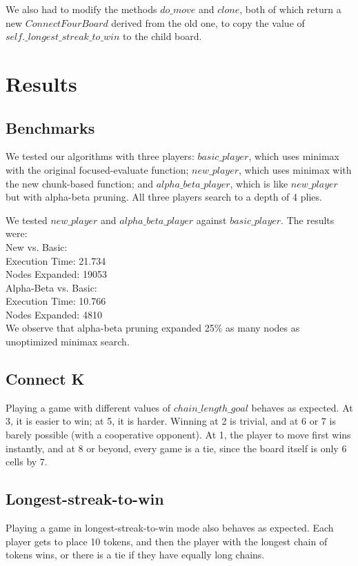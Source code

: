 \documentclass[11pt]{article}
\begin{document}
We also had to modify the methods \(do\_move\) and \(clone\), both of which
return a new \(ConnectFourBoard\) derived from the old one, to copy the value
of \(self.\_longest\_streak\_to\_win\) to the child board.

\section{Results}

\subsection{Benchmarks}

We tested our algorithms with three players: \(basic\_player\), which uses
minimax with the original focused-evaluate function; \(new\_player\), which
uses minimax with the new chunk-based function; and \(alpha\_beta\_player\),
which is like \(new\_player\) but with alpha-beta pruning. All three players
search to a depth of 4 plies.

We tested \(new\_player\) and \(alpha\_beta\_player\) against \(basic\_player\).
The results were:\\

\noindent
New vs. Basic:\\
Execution Time: 21.734\\
Nodes Expanded: 19053\\

\noindent
Alpha-Beta vs. Basic:\\
Execution Time: 10.766\\
Nodes Expanded: 4810\\

We observe that alpha-beta pruning expanded 25\% as many nodes as unoptimized
minimax search.

\subsection{Connect K}

Playing a game with different values of \(chain\_length\_goal\) behaves as
expected. At 3, it is easier to win; at 5, it is harder. Winning at 2 is
trivial, and at 6 or 7 is barely possible (with a cooperative opponent).
At 1, the player to move first wins instantly, and at 8 or beyond, every game
is a tie, since the board itself is only 6 cells by 7.

\subsection{Longest-streak-to-win}

Playing a game in longest-streak-to-win mode also behaves as expected. Each
player gets to place 10 tokens, and then the player with the longest chain
of tokens wins, or there is a tie if they have equally long chains.
\end{document}
